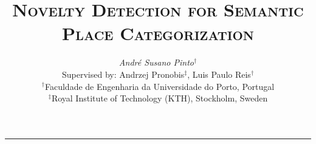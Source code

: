 \documentclass[9pt,a4paper]{extarticle}
\begin{document}
\title{\vspace*{-8mm}\textbf{\textsc{Novelty Detection for Semantic Place Categorization}}}
\author{\emph{André Susano Pinto}$^\dag$\\[2mm]
        \small{Supervised by: Andrzej Pronobis$^\ddag$, Luis Paulo Reis$^\dag$}\\
        \small{$^\dag$Faculdade de Engenharia da Universidade do Porto, Portugal}\\
        \small{$^\ddag$Royal Institute of Technology (KTH), Stockholm, Sweden}}
\date{}
\maketitle
\thispagestyle{empty}

\vspace*{-4mm}\noindent\rule{\textwidth}{0.4pt}\vspace*{4mm}
\end{document}
